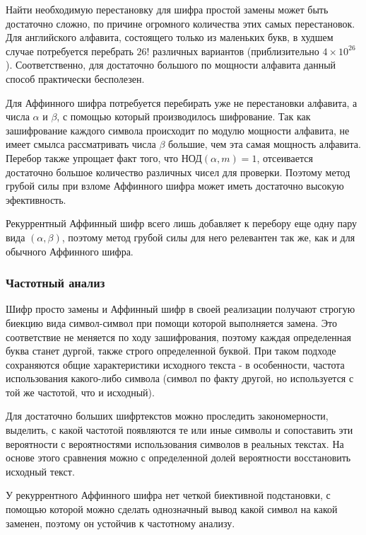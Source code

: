 \documentclass[a4paper]{article}
\begin{document}
  Найти необходимую перестановку для шифра простой замены может быть достаточно сложно, по причине
  огромного количества этих самых перестановок. Для английского алфавита, состоящего только из маленьких
  букв, в худшем случае потребуется перебрать $26!$ различных вариантов (приблизительно $4 \times 10^{26}$).
  Соответственно, для достаточно большого по мощности алфавита данный способ практически бесполезен.

  Для Аффинного шифра потребуется перебирать уже не перестановки алфавита, а числа $\alpha$ и $\beta$,
  с помощью который производилось шифрование. Так как зашифрование каждого символа происходит
  по модулю мощности алфавита, не имеет смылса рассматривать числа $\beta$ большие, чем эта
  самая мощность алфавита. Перебор также упрощает факт того, что НОД$(\alpha, m) = 1$, отсеивается
  достаточно большое количество различных чисел для проверки. Поэтому метод грубой силы при 
  взломе Аффинного шифра может иметь достаточно высокую эфективность.

  Рекуррентный Аффинный шифр всего лишь добавляет к перебору еще одну пару вида $(\alpha, \beta)$,
  поэтому метод грубой силы для него релевантен так же, как и для обычного Аффинного шифра.

  \subsubsection{Частотный анализ}

  Шифр просто замены и Аффинный шифр в своей реализации получают строгую биекцию вида символ-символ
  при помощи которой выполняется замена. Это соответствие не меняется по ходу зашифрования, поэтому 
  каждая определенная буква станет дургой, также строго определенной буквой. При таком подходе
  сохраняются общие характеристики исходного текста - в особенности, частота использования
  какого-либо символа (символ по факту другой, но используется с той же частотой, что и исходный).

  Для достаточно больших шифртекстов можно проследить закономерности, выделить, с какой частотой появляются
  те или иные символы и сопоставить эти вероятности с вероятностями использования символов в реальных текстах.
  На основе этого сравнения можно с определенной долей вероятности восстановить исходный текст.

  У рекуррентного Аффинного шифра нет четкой биективной подстановки, с помощью которой можно 
  сделать однозначный вывод какой символ на какой заменен, поэтому он устойчив к частотному анализу.
\end{document}
